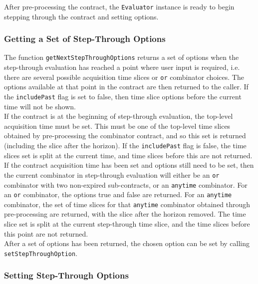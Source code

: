 After pre-processing the contract, the \texttt{Evaluator} instance is ready to begin stepping through the contract and setting options.


\subsubsection{Getting a Set of Step-Through Options}

The function \texttt{getNextStepThroughOptions} returns a set of options when the step-through evaluation has reached a point where user input is required, i.e. there are several possible acquisition time slices or \texttt{or} combinator choices. The options available at that point in the contract are then returned to the caller. If the \texttt{includePast} flag is set to false, then time slice options before the current time will not be shown. \\

If the contract is at the beginning of step-through evaluation, the top-level acquisition time must be set. This must be one of the top-level time slices obtained by pre-processing the combinator contract, and so this set is returned (including the slice after the horizon). If the \texttt{includePast} flag is false, the time slices set is split at the current time, and time slices before this are not returned. \\

If the contract acquisition time has been set and options still need to be set, then the current combinator in step-through evaluation will either be an \texttt{or} combinator with two non-expired sub-contracts, or an \texttt{anytime} combinator. For an \texttt{or} combinator, the options true and false are returned. For an \texttt{anytime} combinator, the set of time slices for that \texttt{anytime} combinator obtained through pre-processing are returned, with the slice after the horizon removed. The time slice set is split at the current step-through time slice, and the time slices before this point are not returned. \\

After a set of options has been returned, the chosen option can be set by calling \texttt{setStepThroughOption}.


\subsubsection{Setting Step-Through Options}

